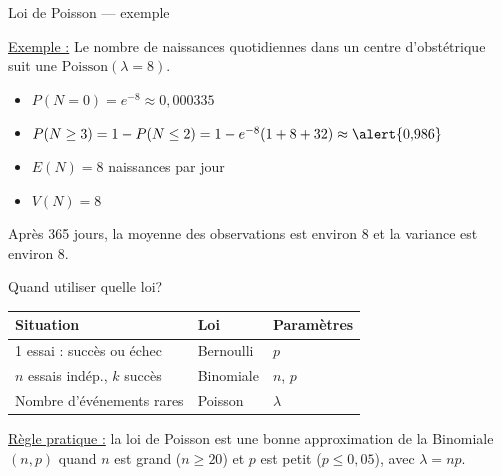 \documentclass{BeamerTemplate}
\begin{document}
\begin{frame}[t]{Loi de Poisson — exemple}

\underline{Exemple :} Le nombre de naissances quotidiennes dans un centre d'obstétrique suit une $\text{Poisson}(\lambda = 8)$.

\bigskip
\begin{itemize}\itemsep5mm
  \item $P(N = 0) = e^{-8} \approx 0{,}000335$
  \item $P(N \ge 3) = 1 - P(N \le 2) = 1 - e^{-8}(1 + 8 + 32) \approx \alert{0{,}986}$
  \item $E(N) = 8$ naissances par jour
  \item $V(N) = 8$
\end{itemize}

\bigskip
Après 365 jours, la moyenne des observations est environ $8$ et la variance est environ $8$.

\end{frame}

\begin{frame}[t]{Quand utiliser quelle loi?}

\begin{center}
\begin{tabular}{lll}\hline
\textbf{Situation} & \textbf{Loi} & \textbf{Paramètres} \\ \hline
1 essai : succès ou échec & Bernoulli & $p$ \\[4pt]
$n$ essais indép., $k$ succès & Binomiale & $n$, $p$ \\[4pt]
Nombre d'événements rares & Poisson & $\lambda$ \\ \hline
\end{tabular}
\end{center}

\bigskip
\underline{Règle pratique :} la loi de Poisson est une bonne approximation de la Binomiale$(n, p)$ quand $n$ est grand ($n \ge 20$) et $p$ est petit ($p \le 0{,}05$), avec $\lambda = np$.

\end{frame}
\end{document}

